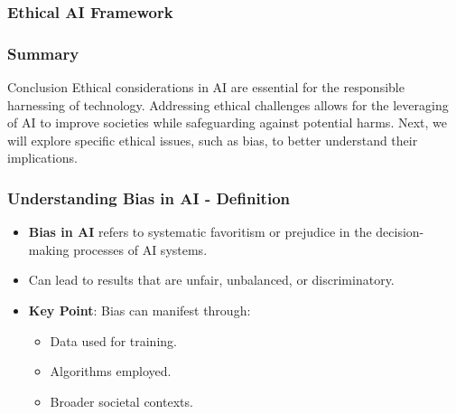 \documentclass{beamer}
\begin{document}
\begin{frame}[fragile]
    \frametitle{Ethical AI Framework}
    \begin{center}
    \end{center}
\end{frame}

\begin{frame}[fragile]
    \frametitle{Summary}
    \begin{block}{Conclusion}
        Ethical considerations in AI are essential for the responsible harnessing of technology. 
        Addressing ethical challenges allows for the leveraging of AI to improve societies while safeguarding against potential harms. 
        Next, we will explore specific ethical issues, such as bias, to better understand their implications.
    \end{block}
\end{frame}

\begin{frame}[fragile]
    \frametitle{Understanding Bias in AI - Definition}
    \begin{itemize}
        \item \textbf{Bias in AI} refers to systematic favoritism or prejudice in the decision-making processes of AI systems.
        \item Can lead to results that are unfair, unbalanced, or discriminatory.
        \item \textbf{Key Point}: Bias can manifest through:
        \begin{itemize}
            \item Data used for training.
            \item Algorithms employed.
            \item Broader societal contexts.
        \end{itemize}
    \end{itemize}
\end{frame}
\end{document}
